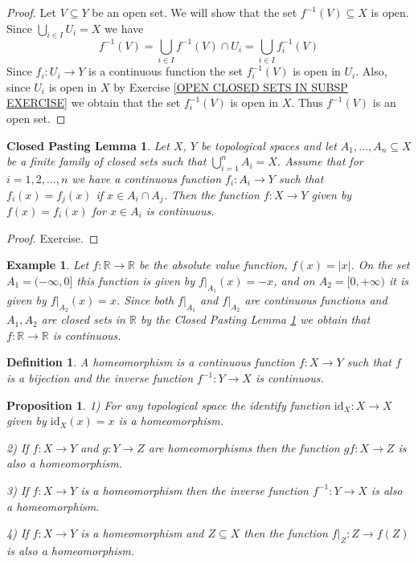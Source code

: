 \documentclass[11pt, letterpaper, oneside]{report}
\theoremstyle{pplain}
\newtheorem{proposition}[theorem]{Proposition}
\newtheorem{CPASTINGL}[theorem]{Closed Pasting Lemma}
\newtheorem{ITERMVALUE THM}[theorem]{Intermediate Value Theorem}
\newtheorem{HEINEBOREL THM}[theorem]{Heine-Borel Theorem}
\newtheorem{UMETR THM}[theorem]{Urysohn Metrization Theorem}
\newtheorem{UMETR2 THM}[theorem]{Urysohn Metrization Theorem (v.2)}
\theoremstyle{ddefinition}
\newtheorem{definition}[theorem]{Definition}
\newtheorem{example}[theorem]{Example}
\theoremstyle{nnn}
\newtheorem{TDA NN}[theorem]{Topological Data Analysis. }
\theoremstyle{eexercise}
\newcommand{\R}{{\mathbb R}}
\newcommand{\id}{\mathrm{id}}
\begin{document}
\begin{proof}
Let $V\subseteq Y$ be an open set. We will show that the set $f^{-1}(V)\subseteq X$ is open. 
Since $\bigcup_{i\in I}U_{i}= X$ we have 
$$f^{-1}(V) = \bigcup_{i\in I} f^{-1}(V)\cap U_{i} =\bigcup_{i\in I} f_{i}^{-1}(V)$$ 
Since $f_{i}\colon U_{i}\to Y$ is a continuous function the set $ f_{i}^{-1}(V)$ is open in $U_{i}$. 
Also, since $U_{i}$ is open in $X$  by Exercise \ref{OPEN CLOSED SETS IN SUBSP EXERCISE}
we obtain that the set $f^{-1}_{i}(V)$ is open in $X$. Thus $f^{-1}(V)$ is an open set.   
\end{proof}


\begin{CPASTINGL}
\label{CLOSED PASTING LEMMA}
Let $X$, $Y$ be topological spaces and let $A_{1}, \dots, A_{n}\subseteq X$ be a finite family of 
closed sets such that $\bigcup_{i=1} ^{n}A_{i} = X$. Assume that for  $i = 1, 2, \dots, n$ we have a continuous 
function  $f_{i}\colon A_{i}\to Y$ such that $f_{i}(x) = f_{j}(x)$ if $x\in A_{i}\cap A_{j}$. 
Then the function $f\colon X\to Y$  given by $f(x) = f_{i}(x)$ for  $x\in A_{i}$ is continuous. 
\end{CPASTINGL}

\begin{proof}
Exercise.
\end{proof}


\begin{example}
Let $f \colon \R\to \R$ be the absolute value function,  $f(x) = |{x}|$.  On the set $A_{1} = (-\infty, 0]$ 
this function is given by $f|_{A_{1}}(x) = -x$, and on $A_{2} = [0, +\infty)$ it is given by $f|_{A_{2}}(x) = x$. Since both  
$f|_{A_{1}}$ and $f|_{A_{2}}$ are continuous functions and $A_{1}, A_{2}$ are closed sets in $\R$  by the 
Closed Pasting Lemma   \ref{CLOSED PASTING LEMMA} we obtain that $f\colon \R\to \R$ is continuous. 
\end{example}



\begin{definition}
A \emph{homeomorphism} is a continuous function $f\colon X\to Y$ such that 
$f$ is a bijection and the inverse function $f^{-1}\colon Y\to X$ is continuous.
\end{definition}

\begin{proposition} 
\label{HOMEO PROPERTIES PROP}
1)  For any topological space the identify function $\id_{X}\colon X\to X$ given by $\id_{X}(x) = x$
is a homeomorphism. 

2) If $f\colon X\to Y$ and $g\colon Y\to Z$ are homeomorphisms then the function $gf\colon X\to Z$
is also a homeomorphism.

3) If $f\colon X\to Y$ is a homeomorphism then the inverse function $f^{-1}\colon Y\to X$ is 
also a homeomorphism. 

4) If $f\colon X\to Y$ is a homeomorphism and $Z\subseteq X$ then the function $f|_{Z}\colon Z \to f(Z)$
is also a homeomorphism. 
\end{proposition}
\end{document}
